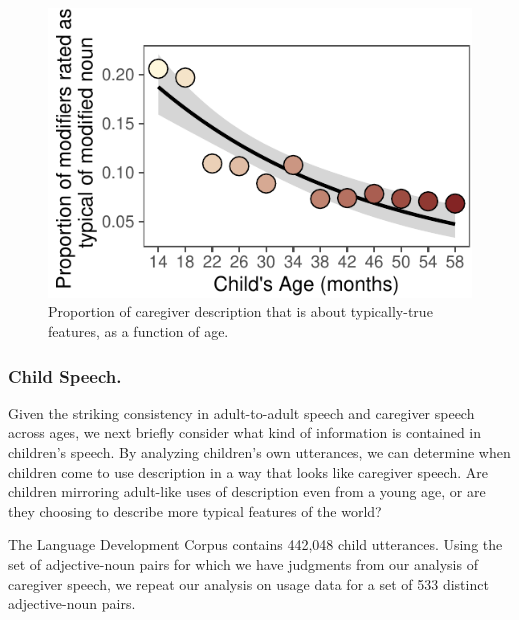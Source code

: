 \documentclass[10pt, letterpaper]{article}
\newenvironment{CodeChunk}{}{}
\begin{document}
\begin{CodeChunk}
\begin{figure}[tb]

{\centering \includegraphics{figs/prototypical_plot-1} 

}

\caption[Proportion of caregiver description that is about typically-true features, as a function of age]{Proportion of caregiver description that is about typically-true features, as a function of age.}\label{fig:prototypical_plot}
\end{figure}
\end{CodeChunk}

\hypertarget{child-speech.}{%
\subsubsection{Child Speech.}\label{child-speech.}}

Given the striking consistency in adult-to-adult speech and caregiver
speech across ages, we next briefly consider what kind of information is
contained in children's speech. By analyzing children's own utterances,
we can determine when children come to use description in a way that
looks like caregiver speech. Are children mirroring adult-like uses of
description even from a young age, or are they choosing to describe more
typical features of the world?

The Language Development Corpus contains 442,048 child utterances. Using
the set of adjective-noun pairs for which we have judgments from our
analysis of caregiver speech, we repeat our analysis on usage data for a
set of 533 distinct adjective-noun pairs.
\end{document}
